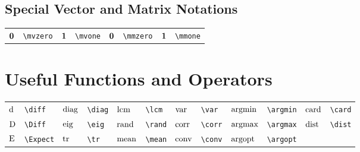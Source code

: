 \documentclass{article}
\begin{document}
\subsection{Special Vector and Matrix Notations}
\begin{tabular}{*{8}{l}}
${\bm 0}$ & \lstinline`\mvzero` & ${\bm 1}$ & \lstinline`\mvone` & ${\mathbf 0}$ & \lstinline`\mmzero` & ${\mathbf 1}$ & \lstinline`\mmone` \\
\end{tabular}


\section{Useful Functions and Operators}
\begin{tabular}{*{12}{l}}
$\operatorname{d\!}$ & \lstinline`\diff` & $\operatorname{diag}$ & \lstinline`\diag` & $\operatorname{lcm}$ & \lstinline`\lcm` & $\operatorname{var}$ & \lstinline`\var` & $\operatorname*{argmin}$ & \lstinline`\argmin` & $\operatorname{card}$ & \lstinline`\card`\\
$\operatorname{D}$ & \lstinline`\Diff` & $\operatorname{eig}$ & \lstinline`\eig` & $\operatorname{rand}$ & \lstinline`\rand` & $\operatorname{corr}$ & \lstinline`\corr` & $\operatorname*{argmax}$ & \lstinline`\argmax` & $\operatorname*{dist}$ & \lstinline`\dist`\\
$\operatorname{E}$ & \lstinline`\Expect` & $\operatorname{tr}$ & \lstinline`\tr` & $\operatorname{mean}$ & \lstinline`\mean` & $\operatorname{conv}$ & \lstinline`\conv` & $\operatorname*{argopt}$ & \lstinline`\argopt` & \\
\end{tabular}
\end{document}
